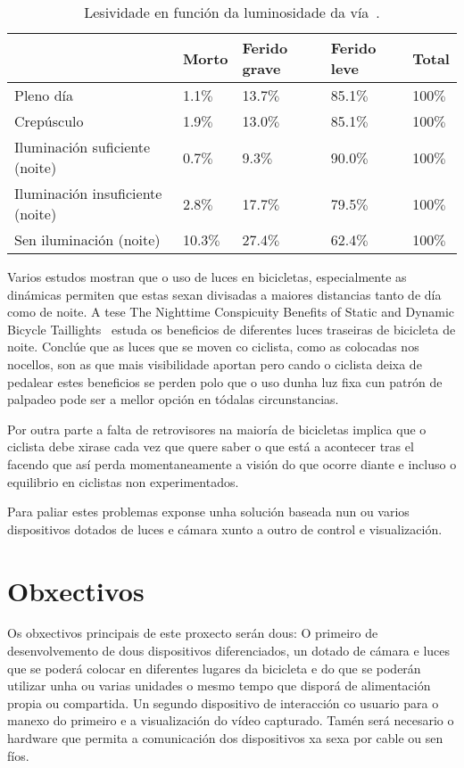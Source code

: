 \begin{table}[tb]
  \caption{Lesividade en función da luminosidade da vía~\cite{ESTUDIOANALISISSINIESTRALIDAD}. }
  \label{tab:lesividade}
    \begin{center}
        \begin{tabular}{|l|l|l|l|l|}
            \hline
             & Morto & Ferido grave & Ferido leve & Total\\ \hline
             Pleno día & 1.1\(\%\)& 13.7\(\%\) & 85.1\(\%\)& 100\(\%\)\\ \hline
             Crepúsculo & 1.9\(\%\) & 13.0\(\%\) &85.1\(\%\) &100\(\%\)\\ \hline
             Iluminación suficiente (noite) &0.7\(\%\) &9.3\(\%\) &90.0\(\%\)  & 100\(\%\)\\ \hline
             Iluminación insuficiente (noite)  & 2.8\(\%\)& 17.7\(\%\)& 79.5\(\%\)& 100\(\%\)\\ \hline
             Sen iluminación (noite) & 10.3\(\%\)& 27.4\(\%\)&62.4\(\%\) & 100\(\%\) \\ \hline
        \end{tabular}
    \end{center}

\end{table}

Varios estudos mostran que o uso de luces en bicicletas, especialmente as dinámicas permiten que estas sexan divisadas a maiores distancias tanto de día como de noite. A tese The Nighttime Conspicuity Benefits of Static and Dynamic Bicycle Taillights~\cite{edewaardNighttimeConspicuityBenefits2017} estuda os beneficios de diferentes luces traseiras de bicicleta de noite. Conclúe que as luces que se moven co ciclista, como as colocadas nos nocellos, son as que mais visibilidade aportan pero cando o ciclista  deixa de pedalear estes beneficios se perden polo que o uso dunha luz fixa cun patrón de palpadeo pode ser a mellor opción en tódalas circunstancias.

Por outra parte a falta de retrovisores na maioría de bicicletas implica que o ciclista debe xirase cada vez que quere saber o que está a acontecer tras el facendo que así perda momentaneamente a visión do que ocorre diante e incluso o equilibrio en ciclistas non experimentados.

Para paliar estes problemas exponse unha solución baseada nun ou varios dispositivos dotados de luces e cámara xunto a outro de control e visualización.


\section{Obxectivos}
\label{sec:obxectivos}
Os obxectivos principais de este proxecto serán dous:
O primeiro de desenvolvemento de dous dispositivos diferenciados, un dotado de cámara e luces que se poderá colocar en diferentes lugares da bicicleta e do que se poderán utilizar unha ou varias unidades o mesmo tempo que disporá de alimentación propia ou compartida. Un segundo dispositivo de interacción co usuario para o manexo do primeiro e a visualización do vídeo capturado. Tamén será necesario o hardware que permita a comunicación dos dispositivos xa sexa por cable ou sen fíos.

